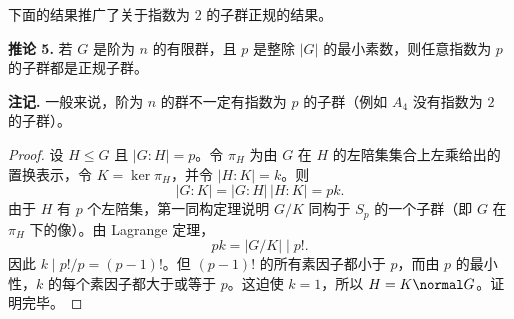 下面的结果推广了关于指数为 $2$ 的子群正规的结果。

\medskip
\noindent\textbf{推论 5.} 若 $G$ 是阶为 $n$ 的有限群，且 $p$ 是整除 $|G|$ 的最小素数，则任意指数为 $p$ 的子群都是正规子群。

\noindent\textbf{注记.} 一般来说，阶为 $n$ 的群不一定有指数为 $p$ 的子群（例如 $A_4$ 没有指数为 $2$ 的子群）。

\begin{proof}
设 $H\leq G$ 且 $|G:H|=p$。令 $\pi_H$ 为由 $G$ 在 $H$ 的左陪集集合上左乘给出的置换表示，令 $K=\ker\pi_H$，并令 $|H:K|=k$。则
\[
  |G:K|=|G:H|\,|H:K|=pk.
\]
由于 $H$ 有 $p$ 个左陪集，第一同构定理说明 $G/K$ 同构于 $S_p$ 的一个子群（即 $G$ 在 $\pi_H$ 下的像）。由 Lagrange 定理，
\[
  pk=|G/K|\mid p!.
\]
因此 $k\mid p!/p=(p-1)!$。但 $(p-1)!$ 的所有素因子都小于 $p$，而由 $p$ 的最小性，$k$ 的每个素因子都大于或等于 $p$。这迫使 $k=1$，所以 $H=K\normal G$。证明完毕。
\end{proof}

